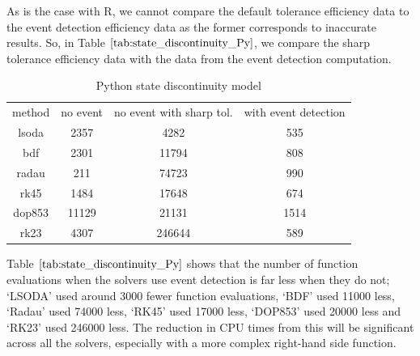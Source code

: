 As is the case with R, we cannot compare the default tolerance efficiency data to the event detection efficiency data as the former corresponds to inaccurate results. So, in Table $\ref{tab:state_discontinuity_Py}$, we compare the sharp tolerance efficiency data with the data from the event detection computation.

\begin{table}[h]
\caption {Python state discontinuity model} \label{tab:state_discontinuity_Py}
\begin{center}
\begin{tabular}{ c c c c } 
method & no event & no event with sharp tol. & with event detection \\ 
lsoda & 2357 & 4282 & 535 \\
bdf & 2301 & 11794 & 808 \\
radau & 211 & 74723 & 990 \\
rk45 & 1484 & 17648 & 674 \\
dop853 & 11129 & 21131 & 1514 \\
rk23 & 4307 & 246644 & 589 \\
\end{tabular}
\end{center}
\end{table}

Table $\ref{tab:state_discontinuity_Py}$ shows that the number of function evaluations when the solvers use event detection is far less when they do not; `LSODA' used around 3000 fewer function evaluations, `BDF' used 11000 less, `Radau' used 74000 less, `RK45' used 17000 less, `DOP853' used 20000 less and `RK23' used 246000 less. The reduction in CPU times from this will be significant across all the solvers, especially with a more complex right-hand side function.

